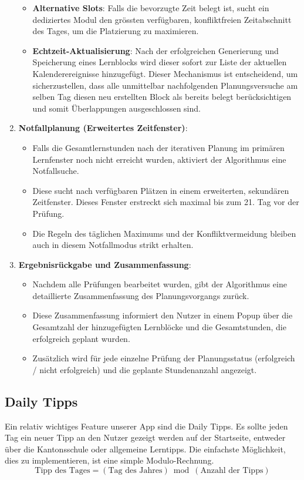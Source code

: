 \documentclass[12pt,a4paper]{report}
\begin{document}
\begin{enumerate}
\begin{itemize}
        \item \textbf{Alternative Slots}: Falls die bevorzugte Zeit belegt ist, sucht ein dediziertes Modul den grössten verfügbaren, konfliktfreien Zeitabschnitt des Tages, um die Platzierung zu maximieren.
        \item \textbf{Echtzeit-Aktualisierung}: Nach der erfolgreichen Generierung und Speicherung eines Lernblocks wird dieser sofort zur Liste der aktuellen Kalenderereignisse hinzugefügt. Dieser Mechanismus ist entscheidend, um sicherzustellen, dass alle unmittelbar nachfolgenden Planungsversuche am selben Tag diesen neu erstellten Block als bereits belegt berücksichtigen und somit Überlappungen ausgeschlossen sind.
    \end{itemize}
    \item \textbf{Notfallplanung (Erweitertes Zeitfenster)}:
    \begin{itemize}
        \item Falls die Gesamtlernstunden nach der iterativen Planung im primären Lernfenster noch nicht erreicht wurden, aktiviert der Algorithmus eine Notfallsuche.
        \item Diese sucht nach verfügbaren Plätzen in einem erweiterten, sekundären Zeitfenster. Dieses Fenster erstreckt sich maximal bis zum 21. Tag vor der Prüfung.
        \item Die Regeln des täglichen Maximums und der Konfliktvermeidung bleiben auch in diesem Notfallmodus strikt erhalten.
    \end{itemize}
    \item \textbf{Ergebnisrückgabe und Zusammenfassung}:
    \begin{itemize}
        \item Nachdem alle Prüfungen bearbeitet wurden, gibt der Algorithmus eine detaillierte Zusammenfassung des Planungsvorgangs zurück.
        \item Diese Zusammenfassung informiert den Nutzer in einem Popup über die Gesamtzahl der hinzugefügten Lernblöcke und die Gesamtstunden, die erfolgreich geplant wurden.
        \item Zusätzlich wird für jede einzelne Prüfung der Planungsstatus (erfolgreich / nicht erfolgreich) und die geplante Stundenanzahl angezeigt.
    \end{itemize}
\end{enumerate}


\subsection{Daily Tipps}
Ein relativ wichtiges Feature unserer App sind die Daily Tipps. Es sollte jeden Tag ein neuer Tipp an den Nutzer gezeigt werden auf der Startseite, entweder über die Kantonsschule oder allgemeine Lerntipps. Die einfachste Möglichkeit, dies zu implementieren, ist eine simple Modulo-Rechnung. 
\[
\text{Tipp des Tages} = (\text{Tag des Jahres}) \bmod (\text{Anzahl der Tipps})
\]
\end{document}
